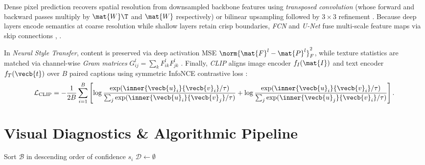 \documentclass[../../../../master.tex]{subfiles}
\begin{document}
\begin{coremath}
Dense pixel prediction recovers spatial resolution from downsampled backbone features using \emph{transposed convolution} (whose forward and backward passes multiply by $\mat{W}\T$ and $\mat{W}$ respectively) or bilinear upsampling followed by $3\times 3$ refinement . Because deep layers encode semantics at coarse resolution while shallow layers retain crisp boundaries, \emph{FCN} and \emph{U-Net} fuse multi-scale feature maps via skip connections , .

In \emph{Neural Style Transfer}, content is preserved via deep activation MSE $\norm{\mat{F}^l - \mat{P}^l}_F^2$, while texture statistics are matched via channel-wise \emph{Gram matrices} $G_{ij}^l = \sum_k F_{ik}^l F_{jk}^l$ . Finally, \emph{CLIP} aligns image encoder $f_I(\mat{I})$ and text encoder $f_T(\vecb{t})$ over $B$ paired captions using symmetric InfoNCE contrastive loss :
\begin{equation}
  \mathcal{L}_{\mathrm{CLIP}} = -\frac{1}{2B}\sum_{i=1}^B \left[\log\frac{\exp(\inner{\vecb{u}_i}{\vecb{v}_i}/\tau)}{\sum_j \exp(\inner{\vecb{u}_i}{\vecb{v}_j}/\tau)} + \log\frac{\exp(\inner{\vecb{u}_i}{\vecb{v}_i}/\tau)}{\sum_j \exp(\inner{\vecb{u}_j}{\vecb{v}_i}/\tau)}\right].
\end{equation}
\end{coremath}

\section{Visual Diagnostics \& Algorithmic Pipeline}

\begin{algorithm}[htbp]
\caption{Greedy Non-Maximum Suppression (NMS) for Object Detection}
\DontPrintSemicolon
{}
Sort $\mathcal{B}$ in descending order of confidence $s_i$\;
$\mathcal{D} \gets \emptyset$\;
\end{algorithm}
\end{document}
